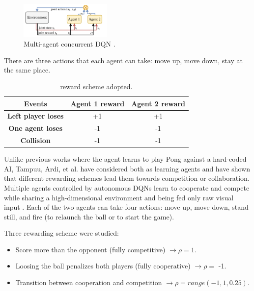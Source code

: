 \begin{figure}[ht]
  \centering
  \includegraphics[width=0.4\textwidth]{images/DQN_MAS.png}
  \caption{Multi-agent concurrent DQN \cite{diallo2017learning}.}
  \label{fig:dqnmas}
\end{figure}

There are three actions that each agent can take: move up, move down, stay at the same place.

\begin{table}[ht]
  \renewcommand{\arraystretch}{1.3}
  \caption{reward scheme adopted.}
  \label{tab:reward-scheme}
  \centering
  \begin{tabular}{@{}ccc@{}}
    \toprule
    \textbf{Events}            & \textbf{Agent 1 reward} & \textbf{Agent 2 reward} \\ \midrule
    \textbf{Left player loses} & +1                      & +1                      \\
    \textbf{One agent loses}   & -1                      & -1                      \\
    \textbf{Collision}         & -1                      & -1                      \\ \bottomrule
  \end{tabular}
\end{table}

Unlike previous works where the agent learns to play Pong against a hard-coded AI, 
Tampuu, Ardi, et al. \cite{tampuu2017multiagent} have considered both as learning agents and have shown that different rewarding schemes lead them towards competition or collaboration.
%
Multiple agents controlled by autonomous DQNs learn to cooperate and compete while sharing a high-dimensional environment and being fed only raw visual input \cite{tampuu2017multiagent}.
%
Each of the two agents can take four actions: 
move up, move down, stand still, and fire (to relaunch the ball or to start the game).
%

\noindent
Three rewarding scheme were studied:
\begin{itemize}
  \item Score more than the opponent (fully competitive) $\rightarrow \rho = 1$.
  \item Loosing the ball penalizes both players (fully cooperative) $\rightarrow \rho = $ -1.
  \item Transition between cooperation and competition $\rightarrow \rho = range(-1, 1, 0.25)$.
\end{itemize}

